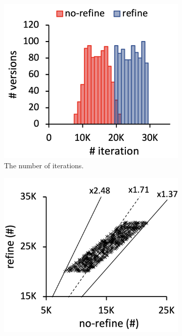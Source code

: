 \begin{figure}
  \centering
  \begin{subfigure}[b]{0.24\textwidth}
    \includegraphics[width=\textwidth]{img/compare-iter}
    \caption{The number of iterations.}
  \end{subfigure}
  \begin{subfigure}[b]{0.24\textwidth}
    \includegraphics[width=\textwidth]{img/ratio-iter}

\end{subfigure}
\end{figure}
